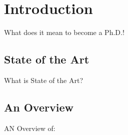 \chapter{Introduction}
What does it mean to become a Ph.D.!

\section{State of the Art}

What is State of the Art?

\section{An Overview}

AN Overview of:


